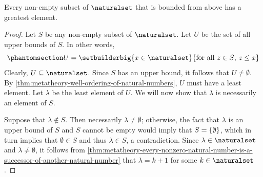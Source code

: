 \begin{thm}
     \label{thm:metatheory-every-non-empty-subset-of-N-that-is-bounded-from-above-has-a-greatest-element}
    Every non-empty subset of \( \naturalset \) that is bounded from above has a greatest element.
\end{thm}

\begin{proof}
    Let \( S \) be any non-empty subset of \( \naturalset \). Let \( U \) be the set of all upper bounds of \( S \).
    In other words,
    \begin{equation}
        \phantomsection \label{eq:U-is-the-set-of-all-upper-bounds-of-S}
        U = \setbuilderbig{x \in \naturalset}{\text{for all \( z \in S \), \( z \leq x \)}}
    \end{equation}
    Clearly, \( U \subseteq \naturalset \).
    Since \( S \) has an upper bound, it follows that \( U \neq \emptyset \).
    By \cref{thm:metatheory-well-ordering-of-natural-numbers}, \( U \) must have a least element.
    Let \( \lambda \) be the least element of \( U \).
    We will now show that \( \lambda \) is necessarily an element of \( S \).

    \vspace{0.3cm}
    \noindent
    Suppose that \( \lambda \notin S \).
    Then necessarily \( \lambda \neq \emptyset \); otherwise, the fact that \( \lambda \) is an upper bound of \( S \) and \( S \) cannot be empty
    would imply that \( S = \mleft\{ \emptyset \mright\} \), which in turn implies that \( \emptyset \in S \) and thus \( \lambda \in S \), a contradiction.
    Since \( \lambda \in \naturalset \) and \( \lambda \neq \emptyset \),
    it follows from \cref{thm:metatheory-every-nonzero-natural-number-is-a-successor-of-another-natural-number}
    that \( \lambda = k + 1 \) for some \( k \in \naturalset \).


\end{proof}
